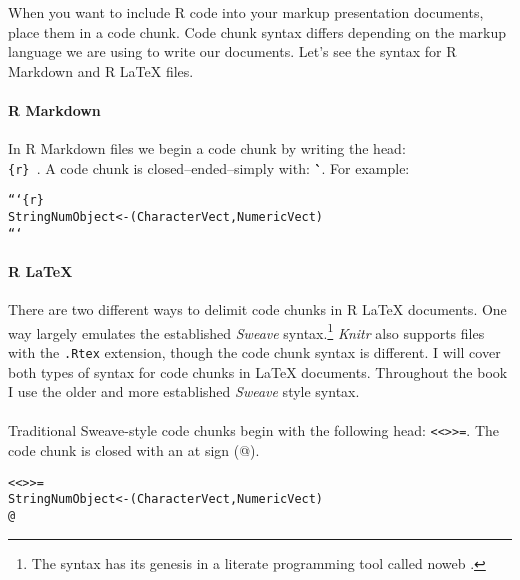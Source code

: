 {When you want to include R code into your markup presentation documents, place them in a code chunk. Code chunk syntax differs depending on the markup language we are using to write our documents. Let's see the syntax for R Markdown and R LaTeX files.

\paragraph{R Markdown}

In R Markdown files we begin a code chunk by writing the head: \texttt{\`\`\`\\ \{r\} }. A code chunk is closed--ended--simply with: \`\`\`\ . For example:

\begin{knitrout}
\color{fgcolor}\begin{kframe}
\begin{alltt}
```\{r\}
StringNumObject <- (CharacterVect, NumericVect)
```
\end{alltt}
\end{kframe}
\end{knitrout}


\paragraph{R LaTeX}

There are two different ways to delimit code chunks in R LaTeX documents. One way largely emulates the established {\emph{Sweave}} syntax.\footnote{The syntax has its genesis in a literate programming tool called noweb \cite[]{Leisch2002,RamseyNoweb}.} {\emph{Knitr}} also supports files with the {\tt{.Rtex}} extension, though the code chunk syntax is different. I will cover both types of syntax for code chunks in LaTeX documents. Throughout the book I use the older and more established {\emph{Sweave}} style syntax. \\[0.25cm]

 \\[0.25cm]

Traditional Sweave-style code chunks begin with the following head: \texttt{\textless\textless \textgreater\textgreater=}. The code chunk is closed with an at sign (@).

\begin{knitrout}
\color{fgcolor}\begin{kframe}
\begin{alltt}
\textless\textless \textgreater\textgreater=
StringNumObject <- (CharacterVect, NumericVect)
@
\end{alltt}
\end{kframe}
\end{knitrout}

}

